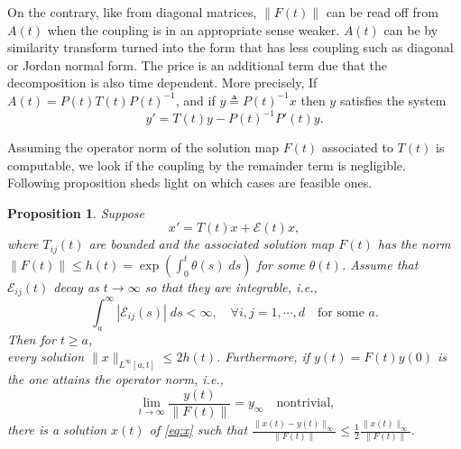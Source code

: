 \documentclass[a4paper,11pt]{article}
\newtheorem{proposition}{Proposition}[section]
\theoremstyle{remark}
\begin{document}
On the contrary, like from diagonal matrices, $\|F(t)\|$ can be read off from $A(t)$ when the coupling is in an appropriate sense weaker. $A(t)$ can be by similarity transform turned into the form that has less coupling such as diagonal or Jordan normal form. The price is an additional term due that the decomposition is also time dependent. More precisely, If $A(t) = P(t)T(t)P(t)^{-1}$, and if $y\triangleq P(t)^{-1}x$ then $y$ satisfies the system
$$ y' = T(t)y - P(t)^{-1}P'(t)y.$$

Assuming the operator norm of the solution map $F(t)$ associated to $T(t)$ is computable, we look if the coupling by the remainder term is negligible. Following proposition sheds light on which cases are feasible ones.
\begin{proposition} \label{prop:stab}
 Suppose
 \begin{equation}
x' = T(t)x + \mathcal{E}(t)x, \label{eq:x}
 \end{equation}
where $T_{ij}(t)$ are bounded and the associated solution map $F(t)$ has the norm $\|F(t)\| \le h(t)=\exp\left(\int_0^t \theta(s)\; ds\right)$ for some $\theta(t)$. Assume that $\mathcal{E}_{ij}(t)$ decay as $t \rightarrow \infty$ so that they are integrable, i.e.,
 $$ \int_a^\infty |\mathcal{E}_{ij}(s)| \; ds < \infty, \quad \forall i,j=1,\cdots,d \quad \text{for some $a$.}$$
 Then for $t\ge a$,\\every solution $\|x\|_{L^\infty[a,t]} \le 2h(t)$. Furthermore, if $y(t)=F(t)y(0)$ is the one attains the operator norm, i.e.,
 $$ \lim_{t \rightarrow \infty}\frac{y(t)}{\|F(t)\|} = y_\infty \quad \text{nontrivial,}$$
 there is a solution $x(t)$ of \eqref{eq:x} such that $\displaystyle \frac{\|x(t)-y(t)\|_\infty}{\|F(t)\|} \le \frac{1}{2}\frac{\|x(t)\|_\infty}{\|F(t)\|}.$
\end{proposition}
\end{document}
